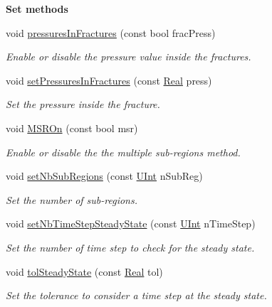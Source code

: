 \begin{Indent}{\bf Set methods}
\begin{DoxyCompactItemize}
void \hyperlink{classFVCode3D_1_1Data_a8f293daea9f1b800a9ff64d5ab320763}{pressures\+In\+Fractures} (const bool frac\+Press)
\begin{DoxyCompactList}\small\item\em Enable or disable the pressure value inside the fractures. \end{DoxyCompactList}\item 
void \hyperlink{classFVCode3D_1_1Data_a07f79ab8c27c169116e58c3d1e0573cd}{set\+Pressures\+In\+Fractures} (const \hyperlink{namespaceFVCode3D_a40c1f5588a248569d80aa5f867080e83}{Real} press)
\begin{DoxyCompactList}\small\item\em Set the pressure inside the fracture. \end{DoxyCompactList}\item 
void \hyperlink{classFVCode3D_1_1Data_a97e72b7484570156f74ab608eb984b00}{M\+S\+R\+On} (const bool msr)
\begin{DoxyCompactList}\small\item\em Enable or disable the the multiple sub-\/regions method. \end{DoxyCompactList}\item 
void \hyperlink{classFVCode3D_1_1Data_a1fc5c4ab0b1abe6aaefb450a00fa27ea}{set\+Nb\+Sub\+Regions} (const \hyperlink{namespaceFVCode3D_a4bf7e328c75d0fd504050d040ebe9eda}{U\+Int} n\+Sub\+Reg)
\begin{DoxyCompactList}\small\item\em Set the number of sub-\/regions. \end{DoxyCompactList}\item 
void \hyperlink{classFVCode3D_1_1Data_a368df5d936a00f3841ac81070ffa748f}{set\+Nb\+Time\+Step\+Steady\+State} (const \hyperlink{namespaceFVCode3D_a4bf7e328c75d0fd504050d040ebe9eda}{U\+Int} n\+Time\+Step)
\begin{DoxyCompactList}\small\item\em Set the number of time step to check for the steady state. \end{DoxyCompactList}\item 
void \hyperlink{classFVCode3D_1_1Data_add1c3c9a2c35ffcd495778613a1624bb}{tol\+Steady\+State} (const \hyperlink{namespaceFVCode3D_a40c1f5588a248569d80aa5f867080e83}{Real} tol)
\begin{DoxyCompactList}\small\item\em Set the tolerance to consider a time step at the steady state. \end{DoxyCompactList}\item 

\end{DoxyCompactItemize}
\end{Indent}
